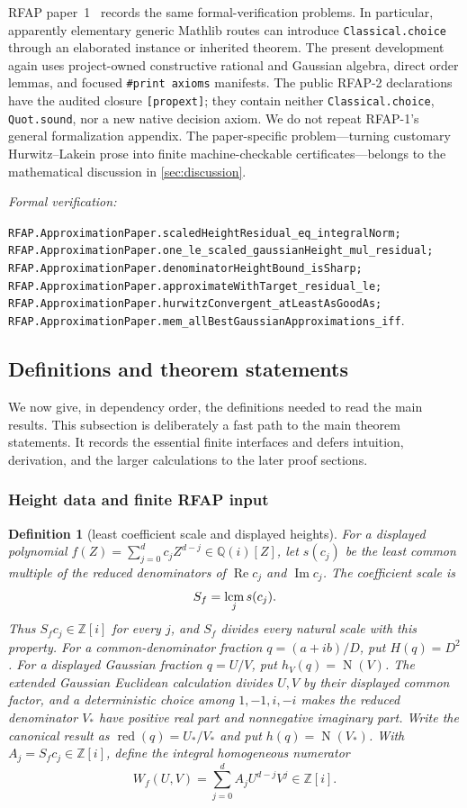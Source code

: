 \documentclass[11pt]{article}
\newtheorem{definition}[definition]{Definition}
\newcommand{\Qi}{\mathbb{Q}(i)}
\newcommand{\Zi}{\mathbb{Z}[i]}
\newcommand{\Norm}[1]{\operatorname{N}\!\left(#1\right)}
\newcommand{\Ree}{\operatorname{Re}}
\newcommand{\Imm}{\operatorname{Im}}
\newcommand{\leanref}[1]{\par\smallskip\noindent
  \emph{Formal verification:}\par\nobreak
  {\raggedright\nolinkurl{#1}.\par}}
\begin{document}
RFAP paper~1~\cite{RFAPOne} records the same formal-verification problems.
In particular, apparently elementary generic Mathlib routes can introduce
\texttt{Classical.choice} through an elaborated instance or inherited
theorem.  The present development again uses project-owned constructive
rational and Gaussian algebra, direct order lemmas, and focused
\texttt{\#print axioms} manifests.  The public RFAP-2 declarations have the
audited closure \texttt{[propext]}; they contain neither
\texttt{Classical.choice}, \texttt{Quot.sound}, nor a new native decision
axiom.  We do not repeat RFAP-1's general formalization appendix.  The
paper-specific problem---turning customary Hurwitz--Lakein prose into finite
machine-checkable certificates---belongs to the mathematical discussion in
\cref{sec:discussion}.

\leanref{RFAP.ApproximationPaper.scaledHeightResidual_eq_integralNorm;
RFAP.ApproximationPaper.one_le_scaled_gaussianHeight_mul_residual;
RFAP.ApproximationPaper.denominatorHeightBound_isSharp;
RFAP.ApproximationPaper.approximateWithTarget_residual_le;
RFAP.ApproximationPaper.hurwitzConvergent_atLeastAsGoodAs;
RFAP.ApproximationPaper.mem_allBestGaussianApproximations_iff}

\subsection{Definitions and theorem statements}
\label{sec:statements}

We now give, in dependency order, the definitions needed to read the main
results.  This subsection is deliberately a fast path to the main theorem
statements.  It records the essential finite interfaces and defers intuition,
derivation, and the larger calculations to the later proof sections.

\subsubsection{Height data and finite RFAP input}

\begin{definition}[least coefficient scale and displayed heights]
\label{def:intro-height}
For a displayed polynomial
$f(Z)=\sum_{j=0}^{d}c_jZ^{d-j}\in\Qi[Z]$, let $s(c_j)$ be the least common
multiple of the reduced denominators of $\Ree c_j$ and $\Imm c_j$.  The
\emph{coefficient scale} is
\[
                         S_f=\mathop{\rm lcm}_j s(c_j).
\]
Thus $S_fc_j\in\Zi$ for every $j$, and $S_f$ divides every natural scale
with this property.  For a common-denominator fraction $q=(a+ib)/D$, put
$H(q)=D^2$.  For a displayed Gaussian fraction $q=U/V$, put
$h_V(q)=\Norm V$.  The extended Gaussian Euclidean calculation divides
$U,V$ by their displayed common factor, and a deterministic choice among
$1,-1,i,-i$ makes the reduced denominator $V_*$ have positive real part and
nonnegative imaginary part.  Write the canonical result as
$\operatorname{red}(q)=U_*/V_*$ and put $h(q)=\Norm{V_*}$.  With
$A_j=S_fc_j\in\Zi$, define the integral homogeneous numerator
\[
             W_f(U,V)=\sum_{j=0}^{d}A_jU^{d-j}V^j\in\Zi.
\]
\end{definition}
\end{document}

